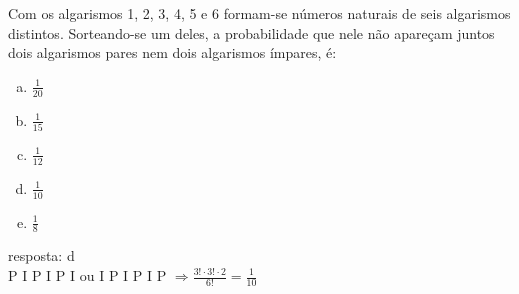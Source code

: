 \begin{ex}
 Com os algarismos 1, 2, 3, 4, 5 e 6 formam-se números naturais de seis algarismos distintos. Sorteando-se um deles, a probabilidade  que nele não apareçam juntos dois algarismos pares nem dois algarismos ímpares, é:
    \begin{enumerate}[(a)]
    \item $\frac{1}{20}$
    \item $\frac{1}{15}$
    \item $\frac{1}{12}$
    \item $\frac{1}{10}$
    \item $\frac{1}{8}$
    \end{enumerate}
      \begin{sol}
       resposta: d \\
       P I P I P I ou I P I P I P $\Longrightarrow \frac{3!\cdot3!\cdot2}{6!}=\frac{1}{10}$
       
      \end{sol}
\end{ex}